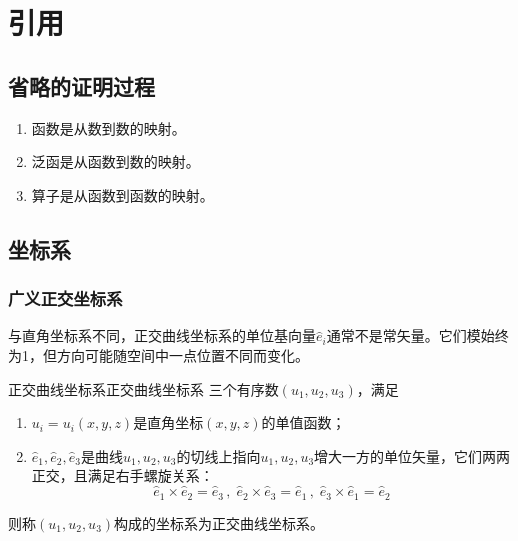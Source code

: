 \chapter{引用}
\section{省略的证明过程}
\begin{enumerate}
    \renewcommand*\labelenumi{\circled{\theenumi}}
    \item 函数是从数到数的映射。
    \item 泛函是从函数到数的映射。
    \item 算子是从函数到函数的映射。
\end{enumerate}
\section{坐标系}
    \subsection{广义正交坐标系}
    
    与直角坐标系不同，正交曲线坐标系的单位基向量$\hat{e}_i$通常不是常矢量。它们模始终为1，但方向可能随空间中一点位置不同而变化。

    \begin{definition}{正交曲线坐标系}{正交曲线坐标系}
        三个有序数$(u_1,u_2,u_3)$，满足
        \begin{enumerate}
            \renewcommand*\labelenumi{(\theenumi)}
            \item $u_i=u_i(x,y,z)$是直角坐标$(x,y,z)$的单值函数；
            \item $\hat{e}_1,\hat{e}_2,\hat{e}_3$是曲线$u_1,u_2,u_3$的切线上指向$u_1,u_2,u_3$增大一方的单位矢量，它们两两正交，且满足右手螺旋关系：
            \begin{equation*}
                \hat{e}_1\times \hat{e}_2=\hat{e}_3\,,\;
                \hat{e}_2\times \hat{e}_3=\hat{e}_1\,,\;
                \hat{e}_3\times \hat{e}_1=\hat{e}_2
            \end{equation*}
        \end{enumerate}
        则称$(u_1,u_2,u_3)$构成的坐标系为正交曲线坐标系。
    \end{definition}



